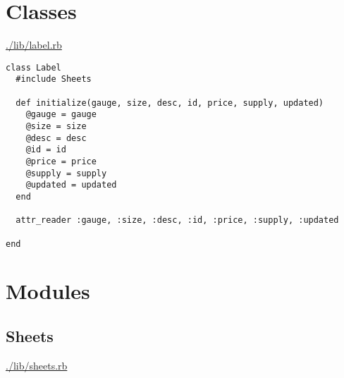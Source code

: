 \documentclass[11pt]{article}
\begin{document}
\section{Classes}
\label{sec-5}

\url{./lib/label.rb}

\begin{verbatim}
class Label
  #include Sheets

  def initialize(gauge, size, desc, id, price, supply, updated)
    @gauge = gauge
    @size = size
    @desc = desc
    @id = id
    @price = price
    @supply = supply
    @updated = updated
  end

  attr_reader :gauge, :size, :desc, :id, :price, :supply, :updated

end
\end{verbatim}

\section{Modules}
\label{sec-6}

\subsection{Sheets}
\label{sec-6-1}

\url{./lib/sheets.rb}
\end{document}
